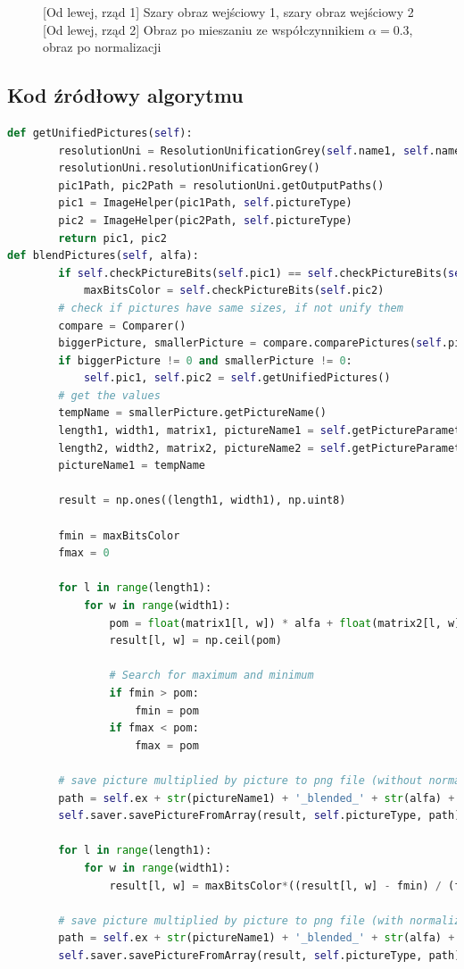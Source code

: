\documentclass[a4paper,12pt, titlepage]{report}
\begin{document}
\begin{figure}[h]
    \caption{[Od lewej, rząd 1] Szary obraz wejściowy 1, szary obraz wejściowy 2 [Od lewej, rząd 2] Obraz po mieszaniu ze współczynnikiem \(\alpha=0.3\), obraz po normalizacji}%
    \label{fig:rysunek}%
\end{figure}
\FloatBarrier
\subsection*{Kod źródłowy algorytmu}
\begin{lstlisting}[language=Python]
def getUnifiedPictures(self):
        resolutionUni = ResolutionUnificationGrey(self.name1, self.name2)
        resolutionUni.resolutionUnificationGrey()
        pic1Path, pic2Path = resolutionUni.getOutputPaths()
        pic1 = ImageHelper(pic1Path, self.pictureType)
        pic2 = ImageHelper(pic2Path, self.pictureType)
        return pic1, pic2
def blendPictures(self, alfa):
        if self.checkPictureBits(self.pic1) == self.checkPictureBits(self.pic2):
            maxBitsColor = self.checkPictureBits(self.pic2)
        # check if pictures have same sizes, if not unify them
        compare = Comparer()
        biggerPicture, smallerPicture = compare.comparePictures(self.pic1, self.pic2)
        if biggerPicture != 0 and smallerPicture != 0:
            self.pic1, self.pic2 = self.getUnifiedPictures()
        # get the values
        tempName = smallerPicture.getPictureName()
        length1, width1, matrix1, pictureName1 = self.getPictureParameters(self.pic1)
        length2, width2, matrix2, pictureName2 = self.getPictureParameters(self.pic2)
        pictureName1 = tempName

        result = np.ones((length1, width1), np.uint8)

        fmin = maxBitsColor
        fmax = 0

        for l in range(length1):
            for w in range(width1):
                pom = float(matrix1[l, w]) * alfa + float(matrix2[l, w]) * (1 - alfa)
                result[l, w] = np.ceil(pom)

                # Search for maximum and minimum
                if fmin > pom:
                    fmin = pom
                if fmax < pom:
                    fmax = pom

        # save picture multiplied by picture to png file (without normalization)
        path = self.ex + str(pictureName1) + '_blended_' + str(alfa) + '_' + str(pictureName2) + '.png'
        self.saver.savePictureFromArray(result, self.pictureType, path)

        for l in range(length1):
            for w in range(width1):
                result[l, w] = maxBitsColor*((result[l, w] - fmin) / (fmax - fmin))

        # save picture multiplied by picture to png file (with normalization)
        path = self.ex + str(pictureName1) + '_blended_' + str(alfa) + '_' + str(pictureName2) + '_normalized.png'
        self.saver.savePictureFromArray(result, self.pictureType, path)
\end{lstlisting}
\end{document}
